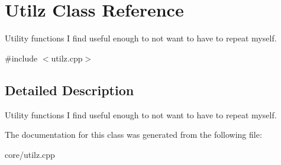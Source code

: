 \hypertarget{classUtilz}{}\section{Utilz Class Reference}
\label{classUtilz}


Utility functions I find useful enough to not want to have to repeat myself.  




{\ttfamily \#include $<$utilz.\+cpp$>$}



\subsection{Detailed Description}
Utility functions I find useful enough to not want to have to repeat myself. 

The documentation for this class was generated from the following file\+:\begin{DoxyCompactItemize}
\item 
core/utilz.\+cpp\end{DoxyCompactItemize}
